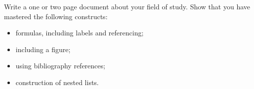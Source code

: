 Write a one or two page document about your field of study. Show that
you have mastered the following constructs:
\begin{itemize}
\item formulas, including labels and referencing;
\item including a figure;
\item using bibliography references;
\item construction of nested lists.
\end{itemize}

